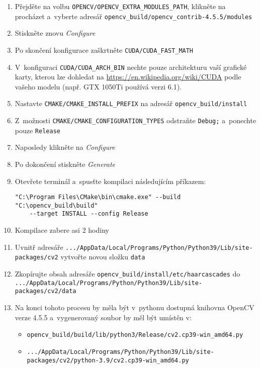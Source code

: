\begin{enumerate}
    \item Přejděte na volbu \texttt{OPENCV/OPENCV\_EXTRA\_MODULES\_PATH}, klikněte na procházet a~vyberte adresář \texttt{opencv\_build/opencv\_contrib-4.5.5/modules}
    \item Stiskněte znovu \emph{Configure}
    \item Po skončení konfigurace zaškrtněte \texttt{CUDA/CUDA\_FAST\_MATH}
    \item V~konfiguraci \texttt{CUDA/CUDA\_ARCH\_BIN} nechte pouze architekturu vaší grafické karty, kterou lze dohledat na \url{https://en.wikipedia.org/wiki/CUDA} podle vašeho modelu (např. GTX 1050Ti používá verzi 6.1).
    \item Nastavte \texttt{CMAKE/CMAKE\_INSTALL\_PREFIX} na adresář \texttt{opencv\_build/install}
    \item Z~možnosti \texttt{CMAKE/CMAKE\_CONFIGURATION\_TYPES} odstraňte \texttt{Debug;} a~ponechte pouze \texttt{Release}
    \item Naposledy klikněte na \emph{Configure}
    \item Po dokončení stiskněte \emph{Generate}
    \item Otevřete terminál a~spusťte kompilaci následujícím příkazem:
    \begin{verbatim}
"C:\Program Files\CMake\bin\cmake.exe" --build "C:\opencv_build\build" 
    --target INSTALL --config Release
    \end{verbatim}
    \item Kompilace zabere asi 2 hodiny
    \item Uvnitř adresáře \texttt{.../AppData/Local/Programs/Python/Python39/Lib\newline /site-packages/cv2} vytvořte novou složku \texttt{data}
    \item Zkopírujte obsah adresáře \texttt{opencv\_build/install/etc/haarcascades} do \newline\texttt{.../AppData/Local/Programs/Python/Python39/Lib/site-packages/cv2/data}
    \item Na konci tohoto procesu by měla být v~pythonu dostupná knihovna OpenCV verze 4.5.5 a~vygenerovaný soubor by měl být umístěn v:
    \begin{itemize}
        \item \texttt{opencv\_build/build/lib/python3/Release/cv2.cp39-win\_amd64.py}
        \item \texttt{.../AppData/Local/Programs/Python/Python39/Lib/site-packages\newline /cv2/python-3.9/cv2.cp39-win\_amd64.py}
    \end{itemize}
\end{enumerate}

